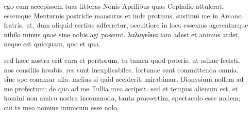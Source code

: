 


 ego cum accepissem tuas litteras Nonis Aprilibus quas Cephalio attulerat, essemque Menturnis postridie mansurus et inde protinus, sustinui me in Arcano fratris, ut, dum aliquid certius adferretur, occultiore in loco essemus agerenturque nihilo minus quae sine nobis agi possunt. λαλαγεῦσα iam adest et animus ardet, neque est quicquam, quo et qua.

 sed haec nostra erit cura et peritorum. tu tamen quod poteris, ut adhuc fecisti, nos consiliis iuvabis. res sunt inexplicabiles. fortunae sunt committenda omnia. sine spe conamur ulla. melius si quid acciderit, mirabimur. Dionysium nollem ad me profectum; de quo ad me Tullia mea scripsit. sed et tempus alienum est, et homini non amico nostra incommoda, tanta praesertim, spectaculo esse nollem; cui te meo nomine inimicum esse nolo.
